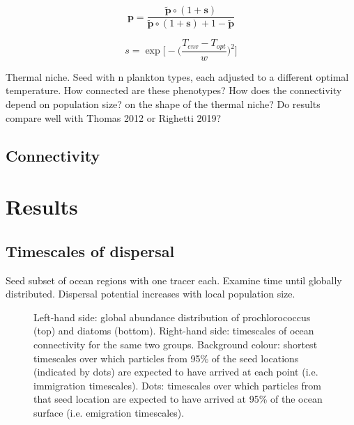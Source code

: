 \documentclass[12pt]{article}
\begin{document}
\begin{equation}
\label{ }
\mathbf{p} = \frac{\mathbf{\tilde{p}} \circ (1+\mathbf{s}) } {\mathbf{\tilde{p}} \circ (1+\mathbf{s}) + 1 -\mathbf{\tilde{p}}}
\end{equation}

\begin{equation}
s = \exp\bigg[-\Big(\frac{T_{env}-T_{opt}}{w}\Big)^2\bigg]
\end{equation}





Thermal niche. Seed with n plankton types, each adjusted to a different optimal temperature. How connected are these phenotypes? How does the connectivity depend on population size? on the shape of the thermal niche? Do results compare well with Thomas 2012 or Righetti 2019?







\subsection{Connectivity}






\section{Results}

\subsection{Timescales of dispersal}

Seed subset of ocean regions with one tracer each. Examine time until globally distributed. Dispersal potential increases with local population size.


\begin{figure}[htp!]

\caption{Left-hand side: global abundance distribution of prochlorococcus (top) and diatoms (bottom). Right-hand side: timescales of ocean connectivity for the same two groups. Background colour: shortest timescales over which particles from 95\% of the seed locations (indicated by dots) are expected to have arrived at each point (i.e. immigration timescales). Dots: timescales over which particles from that seed location are expected to have arrived at 95\% of the ocean surface (i.e. emigration timescales).}
\label{connectivity_90_prctile}
\end{figure}
\end{document}
